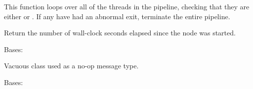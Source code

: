 \documentclass[letterpaper,10pt,english]{sphinxmanual}
\begin{document}
\begin{fulllineitems}
\begin{fulllineitems}
\end{fulllineitems}


\begin{fulllineitems}
\label{\detokenize{api:nanostream.node.NanoNode.thread_monitor}}
This function loops over all of the threads in the pipeline, checking
that they are either  or . If any have had an
abnormal exit, terminate the entire pipeline.

\end{fulllineitems}


\begin{fulllineitems}
\label{\detokenize{api:nanostream.node.NanoNode.time_running}}
Return the number of wall-clock seconds elapsed since the node was
started.

\end{fulllineitems}


\end{fulllineitems}


\begin{fulllineitems}
\label{\detokenize{api:nanostream.node.NothingToSeeHere}}
Bases: 

Vacuous class used as a no-op message type.

\end{fulllineitems}


\begin{fulllineitems}
\label{\detokenize{api:nanostream.node.Parameters}}
Bases: 

\end{fulllineitems}
\end{document}
